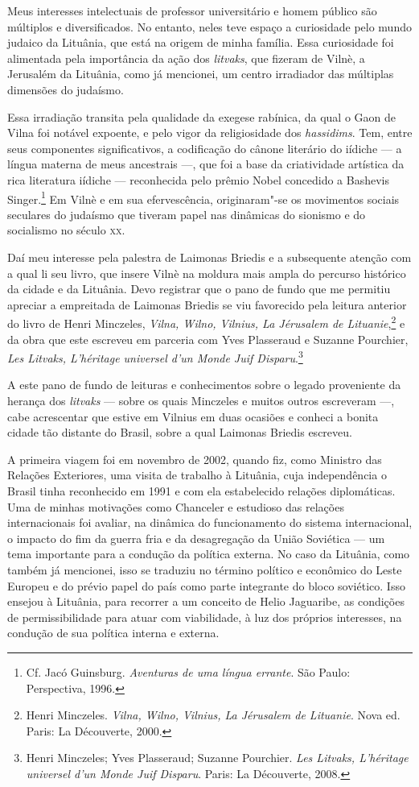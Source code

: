 Meus interesses intelectuais de professor universitário e homem público
são múltiplos e diversificados. No entanto, neles teve espaço a
curiosidade pelo mundo judaico da Lituânia, que está na origem de minha
família. Essa curiosidade foi alimentada pela importância da ação dos
\emph{litvaks}, que fizeram de Vilnè, a Jerusalém da Lituânia, como já
mencionei, um centro irradiador das múltiplas dimensões do judaísmo.

Essa irradiação transita pela qualidade da exegese rabínica, da qual o
Gaon de Vilna foi notável expoente, e pelo vigor da religiosidade dos
\emph{hassidims}. Tem, entre seus componentes significativos, a
codificação do cânone literário do iídiche --- a língua materna de meus
ancestrais ---, que foi a base da criatividade artística da rica
literatura iídiche --- reconhecida pelo prêmio Nobel concedido a Bashevis
Singer.\footnote{Cf. Jacó Guinsburg. \emph{Aventuras de uma língua
  errante}. São Paulo: Perspectiva, 1996.} Em Vilnè e em sua
efervescência, originaram"-se os movimentos sociais seculares do judaísmo
que tiveram papel nas dinâmicas do sionismo e do socialismo no século
\textsc{xx}.

Daí meu interesse pela palestra de Laimonas Briedis e a subsequente
atenção com a qual li seu livro, que insere Vilnè na moldura mais ampla
do percurso histórico da cidade e da Lituânia. Devo registrar que o pano
de fundo que me permitiu apreciar a empreitada de Laimonas Briedis se
viu favorecido pela leitura anterior do livro de Henri Minczeles,
\emph{Vilna, Wilno, Vilnius, La Jérusalem de Lituanie},\footnote{Henri
  Minczeles. \emph{Vilna, Wilno, Vilnius, La Jérusalem de Lituanie}.
  Nova ed. Paris: La Découverte, 2000.} e da obra que este escreveu em
parceria com Yves Plasseraud e Suzanne Pourchier, \emph{Les Litvaks,
L'héritage universel d'un Monde Juif Disparu}.\footnote{Henri Minczeles;
  Yves Plasseraud; Suzanne Pourchier. \emph{Les Litvaks, L'héritage
  universel d'un Monde Juif Disparu}. Paris: La Découverte, 2008.}

A este pano de fundo de leituras e conhecimentos sobre o legado
proveniente da herança dos \emph{litvaks} --- sobre os quais Minczeles e
muitos outros escreveram ---, cabe acrescentar que estive em Vilnius em
duas ocasiões e conheci a bonita cidade tão distante do Brasil, sobre a
qual Laimonas Briedis escreveu.

A primeira viagem foi em novembro de 2002, quando fiz, como Ministro das
Relações Exteriores, uma visita de trabalho à Lituânia, cuja
independência o Brasil tinha reconhecido em 1991 e com ela estabelecido
relações diplomáticas. Uma de minhas motivações como Chanceler e
estudioso das relações internacionais foi avaliar, na dinâmica do
funcionamento do sistema internacional, o impacto do fim da guerra fria
e da desagregação da União Soviética --- um tema importante para a
condução da política externa. No caso da Lituânia, como também já
mencionei, isso se traduziu no término político e econômico do Leste
Europeu e do prévio papel do país como parte integrante do bloco
soviético. Isso ensejou à Lituânia, para recorrer a um conceito de Helio
Jaguaribe, as condições de permissibilidade para atuar com viabilidade,
à luz dos próprios interesses, na condução de sua política interna e
externa.

